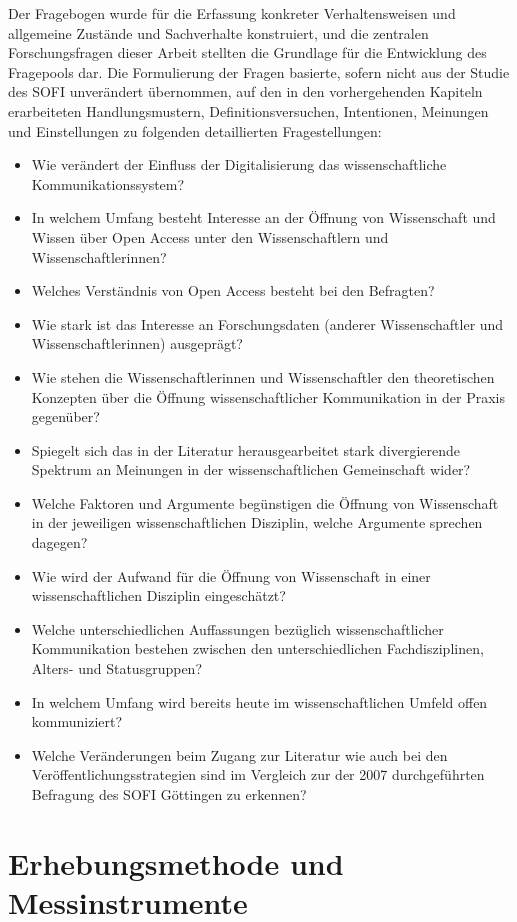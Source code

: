 Der Fragebogen wurde für die Erfassung konkreter Verhaltensweisen und allgemeine Zustände und Sachverhalte \cite{Raab-Steiner_2012} konstruiert, und die zentralen Forschungsfragen dieser Arbeit stellten die Grundlage für die Entwicklung des Fragepools dar. Die Formulierung der Fragen basierte, sofern nicht aus der Studie des SOFI unverändert übernommen, auf den in den vorhergehenden Kapiteln erarbeiteten Handlungsmustern, Definitionsversuchen, Intentionen, Meinungen und Einstellungen zu folgenden detaillierten Fragestellungen:
\begin{itemize}
\item Wie verändert der Einfluss der Digitalisierung das wissenschaftliche Kommunikationssystem?
\item In welchem Umfang besteht Interesse an der Öffnung von Wissenschaft und Wissen über Open Access unter den Wissenschaftlern und Wissenschaftlerinnen?
\item Welches Verständnis von Open Access besteht bei den Befragten?
\item Wie stark ist das Interesse an Forschungsdaten (anderer Wissenschaftler und Wissenschaftlerinnen) ausgeprägt?
\item Wie stehen die Wissenschaftlerinnen und Wissenschaftler den theoretischen Konzepten über die Öffnung wissenschaftlicher Kommunikation in der Praxis gegenüber?
\item Spiegelt sich das in der Literatur herausgearbeitet stark divergierende Spektrum an Meinungen in der wissenschaftlichen Gemeinschaft wider?
\item Welche Faktoren und Argumente begünstigen die Öffnung von Wissenschaft in der jeweiligen wissenschaftlichen Disziplin, welche Argumente sprechen dagegen?
\item Wie wird der Aufwand für die Öffnung von Wissenschaft in einer wissenschaftlichen Disziplin eingeschätzt?
\item Welche unterschiedlichen Auffassungen bezüglich wissenschaftlicher Kommunikation bestehen zwischen den unterschiedlichen Fachdisziplinen, Alters- und Statusgruppen?
\item In welchem Umfang wird bereits heute im wissenschaftlichen Umfeld offen kommuniziert?
\item Welche Veränderungen beim Zugang zur Literatur wie auch bei den Veröffentlichungsstrategien sind im Vergleich zur der 2007 durchgeführten Befragung des SOFI Göttingen zu erkennen?
\end{itemize}

\section{Erhebungsmethode und Messinstrumente}

